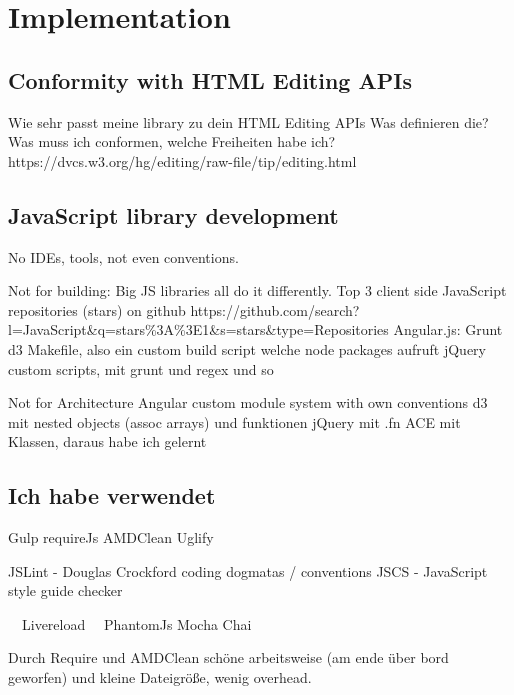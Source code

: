 \chapter{Implementation}

\section{Conformity with HTML Editing APIs}
Wie sehr passt meine library zu dein HTML Editing APIs
Was definieren die?
Was muss ich conformen, welche Freiheiten habe ich?
https://dvcs.w3.org/hg/editing/raw-file/tip/editing.html

\section{JavaScript library development}

No IDEs, tools, not even conventions.

Not for building:
Big JS libraries all do it differently.
Top 3 client side JavaScript repositories (stars) on github
https://github.com/search?l=JavaScript\&q=stars\%3A\%3E1\&s=stars\&type=Repositories
Angular.js: Grunt
d3 Makefile, also ein custom build script welche node packages aufruft
jQuery custom scripts, mit grunt und regex und so

Not for Architecture
Angular custom module system with own conventions
d3 mit nested objects (assoc arrays) und funktionen
jQuery mit .fn
ACE mit Klassen, daraus habe ich gelernt


\section{Ich habe verwendet}

Gulp
requireJs
AMDClean
Uglify

JSLint - Douglas Crockford coding dogmatas / conventions
JSCS - JavaScript style guide checker

~~Livereload~~
PhantomJs
Mocha
Chai

Durch Require und AMDClean schöne arbeitsweise (am ende über bord geworfen) und kleine Dateigröße, wenig overhead.

